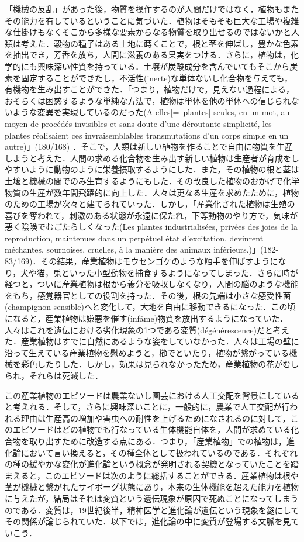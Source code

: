 「機械の反乱」があった後，物質を操作するのが人間だけではなく，植物もまたその能力を有しているということに気づいた．植物はそもそも巨大な工場や複雑な仕掛けもなくそこから多様な要素からなる物質を取り出せるのではないかと人類は考えた．穀物の種子はある土地に蒔くことで，根と茎を伸ばし，豊かな色素を抽出でき，芳香を放ち，人間に滋養のある果実をつける．さらに，植物は，化学的にも興味深い性質を持っている．土壌が炭酸成分を含んでいてもそこから炭素を固定することができたし，不活性(inerte)な単体ないし化合物を与えても，有機物を生み出すことができた．「つまり，植物だけで，見えない過程による，おそらくは困惑するような単純な方法で，植物は単体を他の単体への信じられないような変異を実現しているのだった(A elles[=~plantes] seules, en un mot, au moyen de procédés invisibles et sans doute d'une déroutante simplicité, les plantes réalisaient ces invraisemblables transmutations d'un corps simple en un autre)」(180/168) ．そこで，人類は新しい植物を作ることで自由に物質を生産しようと考えた．人間の求める化合物を生み出す新しい植物は生産者が育成をしやすいように動物のように栄養摂取するようにした．また，その植物の根と茎は土壌と機械の間でのみ生育するようにもした．その改良した植物のおかげで化学物質の生産が数年間飛躍的に向上した．人々は更なる生産を求めたために，植物のための工場が次々と建てられていった．しかし，「産業化された植物は生殖の喜びを奪われて，刺激のある状態が永遠に保たれ，下等動物のやり方で，気味が悪く陰険でむごたらしくなった(Les plantes industrialisées, privées des joies de la reproduction, maintenues dans un perpétuel état d'excitation, devinrent méchantes, sournoises, cruelles, à la manière des animaux inférieurs.)」(182-83/169)．その結果，産業植物はモウセンゴケのような触手を伸ばすようになり，犬や猫，兎といった小型動物を捕食するようになってしまった．さらに時が経つと，ついに産業植物は根から養分を吸収しなくなり，人間の脳のような機能をもち，感覚器官としての役割を持った．その後，根の先端は小さな感受性菌(champignon sensible)へと変化して，大地を自由に移動できるになった．この頃になると，産業植物は嫌悪を催す(infâme)物質を放出するようになっていた．人々はこれを遺伝における劣化現象の1つである変質(dégénérescence)だと考えた．産業植物はすでに自然にあるような姿をしていなかった．人々は工場の壁に沿って生えている産業植物を慰めようと，櫛でといたり，植物が繋がっている機械を彩色したりした．しかし，効果は見られなかったため，産業植物の花がむしられ，それらは死滅した．

この産業植物のエピソードは農業ないし園芸における人工交配を背景にしていると考えれる．そして，さらに興味深いことに，一般的に，農業で人工交配が行われる理由は生産高の増加や害虫への耐性を上げるためになされるのに対して，このエピソードはどの植物でも行なっている生体機能自体を，人間が求めている化合物を取り出すために改造する点にある．つまり，「産業植物」での植物は，進化論において言い換えると，その種全体として扱われているのである．それぞれの種の緩やかな変化が進化論という概念が発明される契機となっていたことを踏まえると，このエピソードは次のように総括することができる．産業植物は根や茎が機械と繋がれたサイボーグ状態にあり，本来の生体機能を超えた能力を植物に与えたが，結局はそれは変質という遺伝現象が原因で死ぬことになってしまうのである．変質は，19世紀後半，精神医学と進化論が遺伝という現象を鎹にしてその関係が論じられていた．以下では，進化論の中に変質が登場する文脈を見ていこう．

